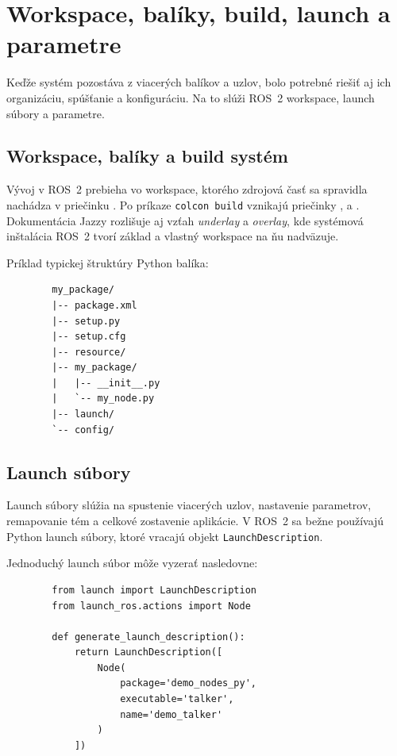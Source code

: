         \section{Workspace, balíky, build, launch a parametre}
      
        Keďže systém pozostáva z viacerých balíkov a uzlov, bolo potrebné riešiť aj ich organizáciu, spúšťanie a konfiguráciu. Na to slúži ROS~2 workspace, launch súbory a parametre.
      
        \subsection*{Workspace, balíky a build systém}
      
        Vývoj v ROS~2 prebieha vo workspace, ktorého zdrojová časť sa spravidla nachádza v priečinku . Po príkaze \texttt{colcon build} vznikajú priečinky ,  a . Dokumentácia Jazzy rozlišuje aj vzťah \emph{underlay} a \emph{overlay}, kde systémová inštalácia ROS~2 tvorí základ a vlastný workspace na ňu nadväzuje.
      
        Príklad typickej štruktúry Python balíka:
      
        \begin{verbatim}
        my_package/
        |-- package.xml
        |-- setup.py
        |-- setup.cfg
        |-- resource/
        |-- my_package/
        |   |-- __init__.py
        |   `-- my_node.py
        |-- launch/
        `-- config/
        \end{verbatim}
      
        \subsection*{Launch súbory}
      
        Launch súbory slúžia na spustenie viacerých uzlov, nastavenie parametrov, remapovanie tém a celkové zostavenie aplikácie. V ROS~2 sa bežne používajú Python launch súbory, ktoré vracajú objekt \texttt{LaunchDescription}.
      
        Jednoduchý launch súbor môže vyzerať nasledovne:
      
        \begin{verbatim}
        from launch import LaunchDescription
        from launch_ros.actions import Node
      
        def generate_launch_description():
            return LaunchDescription([
                Node(
                    package='demo_nodes_py',
                    executable='talker',
                    name='demo_talker'
                )
            ])
        \end{verbatim}
      
